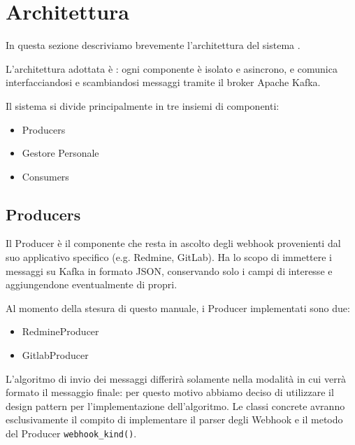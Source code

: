\section{Architettura}\label{Architettura}

In questa sezione descriviamo brevemente l'architettura del sistema \progetto.

L'architettura adottata è : ogni componente è isolato e asincrono,
e comunica interfacciandosi e scambiandosi messaggi tramite il broker Apache Kafka.

Il sistema si divide principalmente in tre insiemi di componenti:

\begin{itemize}
    \item Producers
    \item Gestore Personale
    \item Consumers
\end{itemize}

\subsection{Producers}
Il Producer è il componente che resta in ascolto degli webhook provenienti dal suo applicativo specifico (e.g. Redmine, GitLab).
Ha lo scopo di immettere i messaggi su Kafka in formato JSON, conservando solo i campi di interesse e aggiungendone eventualmente di propri.

Al momento della stesura di questo manuale, i Producer implementati sono due:
\begin{itemize}
    \item RedmineProducer
    \item GitlabProducer
\end{itemize}

L'algoritmo di invio dei messaggi differirà solamente nella modalità in cui verrà formato il messaggio finale: per questo motivo abbiamo deciso di utilizzare
il design pattern  per l'implementazione dell'algoritmo. Le classi concrete avranno esclusivamente il compito di implementare
il parser degli Webhook e il metodo del Producer \texttt{webhook\_kind()}.




